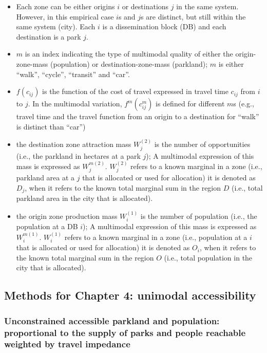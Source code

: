 \documentclass[
11pt, %
oneside, %
english, %
singlespacing, %
]{macthesis} %
\def\tightlist{}
\begin{document}
\begin{itemize}
\tightlist
\item
  Each zone can be either origins \(i\) or destinations \(j\) in the same system. However, in this empirical case \(i\)s and \(j\)s are distinct, but still within the same system (city). Each \(i\) is a dissemination block (DB) and each destination is a park \(j\).
\item
  \(m\) is an index indicating the type of multimodal quality of either the origin-zone-mass (population) or destination-zone-mass (parkland); \(m\) is either ``walk'', ``cycle'', ``transit'' and ``car''.
\item
  \(f(c_{ij})\) is the function of the cost of travel expressed in travel time \(c_{ij}\) from \(i\) to \(j\). In the multimodal variation, \(f^m(c^m_{ij})\) is defined for different \(m\)s (e.g., travel time and the travel function from an origin to a destination for ``walk'' is distinct than ``car'')
\item
  the destination zone attraction mass \(W_j^{(2)}\) is the number of opportunities (i.e., the parkland in hectares at a park \(j\)); A multimodal expression of this mass is expressed as \(W_j^{m(2)}\). \(W_j^{(2)}\) refers to a known marginal in a zone (i.e., parkland area at a \(j\) that is allocated or used for allocation) it is denoted as \(D_j\), when it refers to the known total marginal sum in the region \(D\) (i.e., total parkland area in the city that is allocated).
\item
  the origin zone production mass \(W_i^{(1)}\) is the number of population (i.e., the population at a DB \(i\)); A multimodal expression of this mass is expressed as \(W_i^{m(1)}\). \(W_i^{(1)}\) refers to a known marginal in a zone (i.e., population at a \(i\) that is allocated or used for allocation) it is denoted as \(O_i\), when it refers to the known total marginal sum in the region \(O\) (i.e., total population in the city that is allocated).
\end{itemize}

\subsection{Methods for Chapter 4: unimodal accessibility}\label{methods-for-chapter-4-unimodal-accessibility}

\subsubsection{Unconstrained accessible parkland and population: proportional to the supply of parks and people reachable weighted by travel impedance}\label{unconstrained-accessible-parkland-and-population-proportional-to-the-supply-of-parks-and-people-reachable-weighted-by-travel-impedance}
\end{document}
